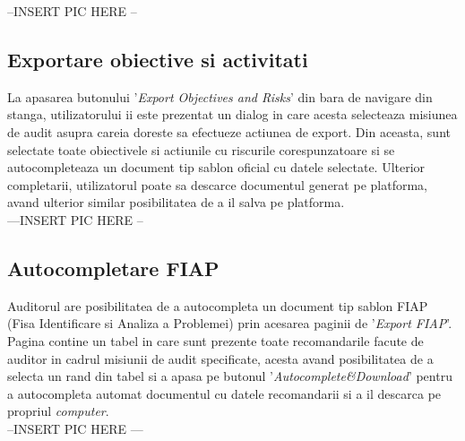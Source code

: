 --INSERT PIC HERE --

\subsection*{Exportare obiective si activitati}
La apasarea butonului '\textit{Export Objectives and Risks}' din bara de navigare din stanga, utilizatorului ii este prezentat un dialog in care acesta selecteaza misiunea de audit asupra careia doreste sa efectueze actiunea de export. Din aceasta, sunt selectate toate obiectivele si actiunile cu riscurile corespunzatoare si se autocompleteaza un document tip sablon oficial cu datele selectate. Ulterior completarii, utilizatorul poate sa descarce documentul generat pe platforma, avand ulterior similar posibilitatea de a il salva pe platforma. \\

---INSERT PIC HERE --

\subsection*{Autocompletare FIAP}
Auditorul are posibilitatea de a autocompleta un document tip sablon FIAP (Fisa Identificare si Analiza a Problemei) prin acesarea paginii de '\textit{Export FIAP}'.\\
Pagina contine un tabel in care sunt prezente toate recomandarile facute de auditor in cadrul misiunii de audit specificate, acesta avand posibilitatea de a selecta un rand din tabel si a apasa pe butonul '\textit{Autocomplete\&Download}' pentru a autocompleta automat documentul cu datele recomandarii si a il descarca pe propriul \textit{computer}.\\

--INSERT PIC HERE ---


 


